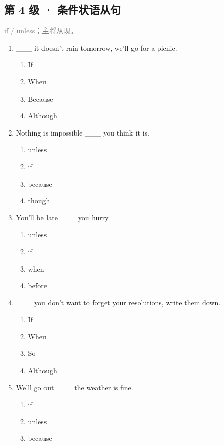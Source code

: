 \documentclass[11pt,a4paper]{ctexart}
\begin{document}
\subsection*{第 4 级 · 条件状语从句}
\noindent\textcolor{gray}{if / unless；主将从现。}\par\smallskip
\begin{enumerate}[leftmargin=*,itemsep=4pt]
\item \_\_\_ it doesn’t rain tomorrow, we’ll go for a picnic.
\begin{enumerate}[label=\Alph*.,leftmargin=2em,itemsep=1pt,topsep=2pt]
\item If
\item When
\item Because
\item Although
\end{enumerate}
\item Nothing is impossible \_\_\_ you think it is.
\begin{enumerate}[label=\Alph*.,leftmargin=2em,itemsep=1pt,topsep=2pt]
\item unless
\item if
\item because
\item though
\end{enumerate}
\item You’ll be late \_\_\_ you hurry.
\begin{enumerate}[label=\Alph*.,leftmargin=2em,itemsep=1pt,topsep=2pt]
\item unless
\item if
\item when
\item before
\end{enumerate}
\item \_\_\_ you don’t want to forget your resolutions, write them down.
\begin{enumerate}[label=\Alph*.,leftmargin=2em,itemsep=1pt,topsep=2pt]
\item If
\item When
\item So
\item Although
\end{enumerate}
\item We’ll go out \_\_\_ the weather is fine.
\begin{enumerate}[label=\Alph*.,leftmargin=2em,itemsep=1pt,topsep=2pt]
\item if
\item unless
\item because

\end{enumerate}
\end{enumerate}
\end{document}
